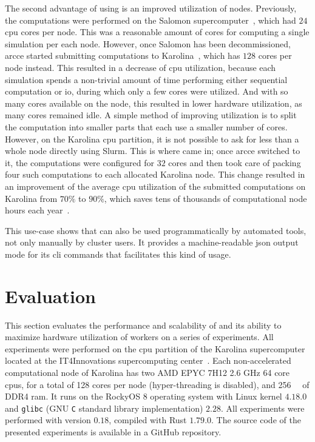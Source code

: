 The second advantage of using \hyperqueue{} is an improved utilization of nodes.
Previously, the computations were performed on the Salomon supercomputer~\cite{salomon},
which had $24$ \gls{cpu} cores per node. This was a reasonable
amount of cores for computing a single simulation per each node. However, once Salomon has been
decommissioned, \gls{arcce} started submitting computations to
Karolina~\cite{karolina}, which has $128$ cores per node instead. This
resulted in a decrease of \gls{cpu} utilization, because each simulation spends a
non-trivial amount of time performing either sequential computation or \gls{io},
during which only a few cores were utilized. And with so many cores available on the node, this
resulted in lower hardware utilization, as many cores remained idle. A simple method of improving
utilization is to split the computation into smaller parts that each use a smaller number of cores.
However, on the Karolina \gls{cpu} partition, it is not possible to ask for less than
a whole node directly using Slurm. This is where \hyperqueue{} came in; once
\gls{arcce} switched to it, the computations were configured for $32$
cores and \hyperqueue{} then took care of packing four such computations to each
allocated Karolina node. This change resulted in an improvement of the average
\gls{cpu} utilization of the submitted computations on Karolina from
$70\%$ to $90\%$, which saves tens of thousands of computational
node hours each year~\cite{cern-hq}.

This use-case shows that \hyperqueue{} can also be used programmatically by automated
tools, not only manually by cluster users. It provides a machine-readable \gls{json}
output mode for its \gls{cli} commands that facilitates this kind of usage.

\section{Evaluation}
\label{hq:evaluation}
This section evaluates the performance and scalability of \hyperqueue{} and its ability
to maximize hardware utilization of workers on a series of experiments. All experiments were
performed on the \gls{cpu} partition of the Karolina
supercomputer~\cite{karolina} located at the IT4Innovations supercomputing
center~\cite{it4i}. Each non-accelerated computational node of Karolina has two AMD
EPYC\texttrademark{} 7H12 2.6 GHz 64 core \glspl{cpu}, for a total of 128 cores
per node (hyper-threading is disabled), and \SI{256}{\gibi\byte} of DDR4
\gls{ram}. It runs on the RockyOS 8 operating system with Linux kernel
$4.18.0$ and \texttt{glibc} (GNU \texttt{C} standard library implementation) $2.28$. All experiments were
performed with \hyperqueue{} version $0.18$, compiled with Rust
$1.79.0$. The source code of the presented experiments is available in
a GitHub repository.

